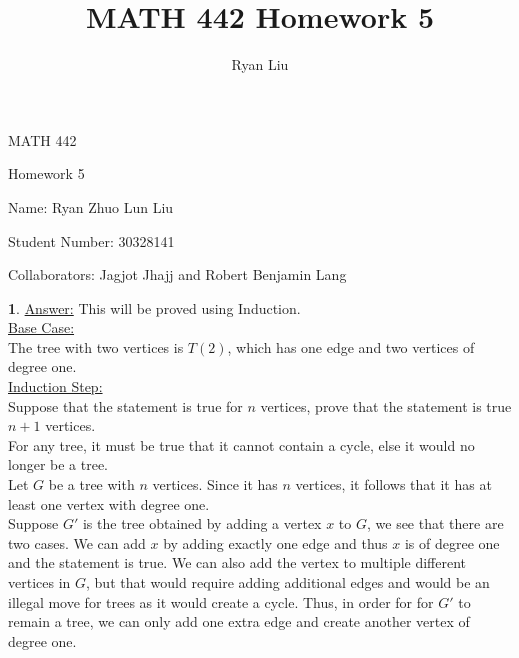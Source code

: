 \documentclass[12pt,a4paper]{article}
\author{Ryan Liu}
\title{MATH 442 Homework 5}
\theoremstyle{definition}
\newtheorem{problem}{}
\begin{document}
\begin{center}
{\huge MATH 442 \par}
{\Large Homework  5  \par}
{\normalsize Name: Ryan Zhuo Lun Liu \par}
{\normalsize Student Number: 30328141 \par}
{\normalsize Collaborators: Jagjot Jhajj and Robert Benjamin Lang }
\end{center}

\begin{problem} \underline{Answer:} This will be proved using Induction. \\
\underline{Base Case:} \\
The tree with two vertices is $T(2)$, which has one edge and two vertices of degree one. \\

\underline{Induction Step:} \\
Suppose that the statement is true for $n$ vertices, prove that the statement is true $n + 1$ vertices. \\

For any tree, it must be true that it cannot contain a cycle, else it would no longer be a tree. \\

Let $G$ be a tree with $n$ vertices. Since it has $n$ vertices, it follows that it has at least one vertex with degree one. \\

Suppose $G'$ is the tree obtained by adding a vertex $x$ to $G$, we see that there are two cases. We can add $x$ by adding exactly one edge and thus $x$ is of degree one and the statement is true. We can also add the vertex to multiple different vertices in $G$, but that would require adding additional edges and would be an illegal move for trees as it would create a cycle. Thus, in order for for $G'$ to remain a tree, we can only add one extra edge and create another vertex of degree one.

\end{problem}
\end{document}
